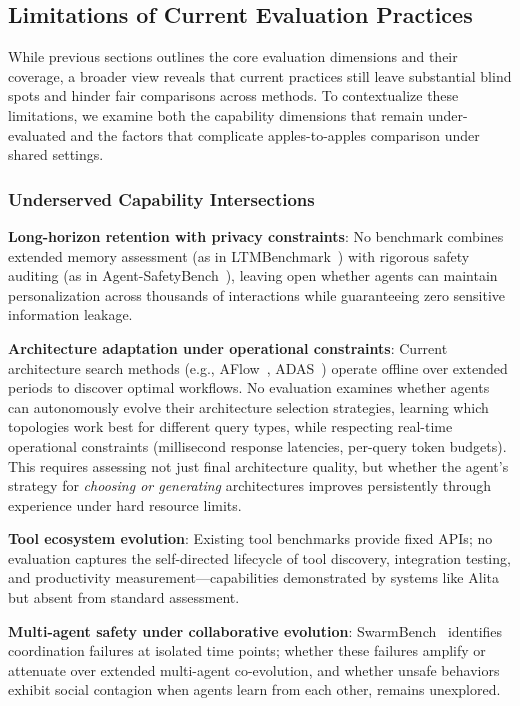 \subsection{Limitations of Current Evaluation Practices}

While previous sections outlines the core evaluation dimensions and their coverage, a broader view reveals that current practices still leave substantial blind spots and hinder fair comparisons across methods. To contextualize these limitations, we examine both the capability dimensions that remain under-evaluated and the factors that complicate apples-to-apples comparison under shared settings.

\subsubsection{Underserved Capability Intersections}


\textbf{Long-horizon retention with privacy constraints}: No benchmark combines extended memory assessment (as in LTMBenchmark~\citep{castillo-bolado2024beyond}) with rigorous safety auditing (as in Agent-SafetyBench~\citep{zhang2024agentsafety}), leaving open whether agents can maintain personalization across thousands of interactions while guaranteeing zero sensitive information leakage.
    
\textbf{Architecture adaptation under operational constraints}: Current architecture search methods (e.g., AFlow~\citep{zhang2024aflow}, ADAS~\citep{hu2024automated}) operate offline over extended periods to discover optimal workflows. No evaluation examines whether agents can autonomously evolve their architecture selection strategies, learning which topologies work best for different query types, while respecting real-time operational constraints (millisecond response latencies, per-query token budgets). This requires assessing not just final architecture quality, but whether the agent's strategy for \emph{choosing or generating} architectures improves persistently through experience under hard resource limits.


    
\textbf{Tool ecosystem evolution}: Existing tool benchmarks provide fixed APIs; no evaluation captures the self-directed lifecycle of tool discovery, integration testing, and productivity measurement—capabilities demonstrated by systems like Alita but absent from standard assessment.
    
\textbf{Multi-agent safety under collaborative evolution}: SwarmBench~\citep{ruan2025benchmarking} identifies coordination failures at isolated time points; whether these failures amplify or attenuate over extended multi-agent co-evolution, and whether unsafe behaviors exhibit social contagion when agents learn from each other, remains unexplored.


